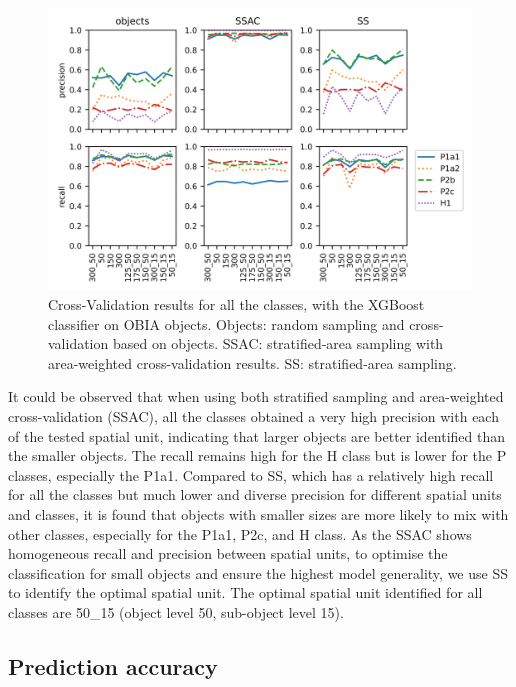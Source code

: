 \documentclass{isprs} %
\begin{document}
  \begin{figure}[!h]
    \centering
    \includegraphics[width=\linewidth]{figures/overview_total.png}
    \caption{Cross-Validation results for all the classes, with the XGBoost classifier on OBIA objects. Objects: random sampling and cross-validation based on objects. SSAC: stratified-area sampling with area-weighted cross-validation results. SS: stratified-area sampling.}
    \label{fig:overview}
\end{figure}

 It could be observed that when using both stratified sampling and area-weighted cross-validation (SSAC), all the classes obtained a very high precision with each of the tested spatial unit, indicating that larger objects are better identified than the smaller objects. The recall remains high for the H class but is lower for the P classes, especially the P1a1. Compared to SS, which has a relatively high recall for all the classes but much lower and diverse precision for different spatial units and classes, it is found that objects with smaller sizes are more likely to mix with other classes, especially for the P1a1, P2c, and H class. As the SSAC shows homogeneous recall and precision between spatial units, to optimise the classification for small objects and ensure the highest model generality, we use SS to identify the optimal spatial unit. The optimal spatial unit identified for all classes are 50\_15 (object level 50, sub-object level 15).   
 

\subsection{Prediction accuracy}
\end{document}
